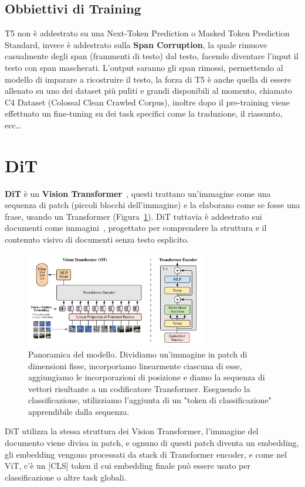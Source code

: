\subsection{Obbiettivi di Training}

T5 non è addestrato su una Next-Token Prediction o Masked Token Prediction Standard, invece è addestrato sulla \textbf{Span Corruption}, la quale rimuove casualmente degli span (frammenti di testo) dal testo, facendo diventare l'input il testo con span mascherati. L'output saranno gli span rimossi, permettendo al modello di imparare a ricostruire il testo, la forza di T5 è anche quella di essere allenato su uno dei dataset più puliti e grandi disponibili al momento, chiamato C4 Dataset (Colossal Clean Crawled Corpus), inoltre dopo il pre-training viene effettuato un fine-tuning su dei task specifici come la traduzione, il riassunto, ecc\dots

\section{DiT}
\textbf{DiT} è un \textbf{Vision Transformer}~\cite{dosovitskiy2021vit}, questi trattano un'immagine come una sequenza di patch (piccoli blocchi dell'immagine) e la elaborano come se fosse una frase, usando un Transformer (Figura~\ref{fig:ViT}). DiT tuttavia è addestrato sui documenti come immagini~\cite{li2023dit}, progettato per comprendere la struttura e il contenuto visivo di documenti senza testo esplicito.
\begin{figure}
    \centering
    \includegraphics[width=0.7\textwidth]{figure/VisionTransformer}
    \caption{Panoramica del modello. Dividiamo un'immagine in patch di dimensioni fisse, incorporiamo linearmente ciascuna di esse, aggiungiamo le incorporazioni di posizione e diamo la sequenza di vettori risultante a un codificatore Transformer. Eseguendo la classificazione, utilizziamo l'aggiunta di un "token di classificazione" apprendibile dalla sequenza.}
    \label{fig:ViT}
\end{figure}
DiT utilizza la stessa struttura dei Vision Transformer, l'immagine del documento viene divisa in patch, e ognuno di questi patch diventa un embedding, gli embedding vengono processati da stack di Transformer encoder, e come nel ViT, c'è un [CLS] token il cui embedding finale può essere usato per classificazione o altre task globali.

